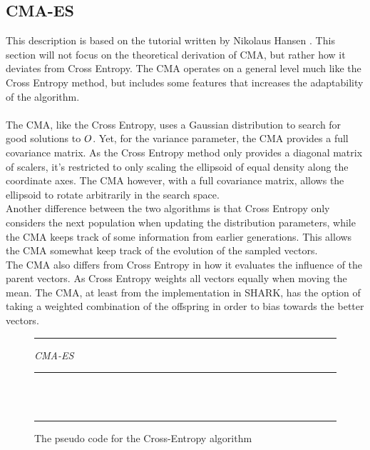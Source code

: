 \subsection{CMA-ES \label{CMAtheory}}


This description is based on the tutorial written by Nikolaus Hansen
\citep{hansen2011}. This section will not focus on the theoretical derivation
of CMA, but rather how it deviates from Cross Entropy. 
The CMA operates on a general level much like the Cross Entropy 
method, but includes some features that increases the adaptability 
of the algorithm.\\
\\
The CMA, like the Cross Entropy, uses a Gaussian distribution to
search for good solutions to $O$. Yet, for the 
variance parameter, the CMA provides a full covariance matrix.
As the Cross Entropy method only provides a diagonal matrix of scalers,
it's restricted to only scaling the ellipsoid of equal density along
the coordinate axes. The CMA however, with a full covariance matrix,
allows the ellipsoid to rotate arbitrarily in the search space.\\
Another difference between the two algorithms is that 
Cross Entropy only considers the next population when updating the
distribution parameters, while the CMA keeps track of 
some information from earlier 
generations. This allows the CMA somewhat keep track of the evolution 
of the sampled vectors.\\
The CMA also differs from Cross Entropy in how it evaluates the influence 
of the parent vectors. As Cross Entropy weights all vectors equally when 
moving the mean. The CMA, at least from the implementation in SHARK, 
has the option of taking a weighted combination of the offspring in order
to bias towards the better vectors.

\begin{figure}[H]
\hrule
\vspace{0.2cm}
{\centering  \textit{CMA-ES}}
\vspace{0.2cm}
\hrule
\begin{algorithmic}
\\
\\
\Loop
{}
\EndLoop
\end{algorithmic}
\hrule
\caption{The pseudo code for the Cross-Entropy algorithm \label{fig:cmaCode}}
\end{figure}

